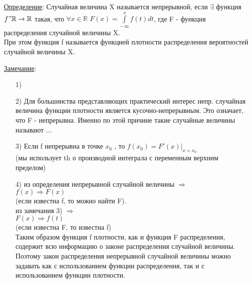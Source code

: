 
\underline{Определение}: Случайная величина X называется непрерывной, если $\exists$ функция $f" \mathbb{R} \to \mathbb{R}$ такая, что $\forall x \in \mathbb{R}$ $F(x) = \int\limits_{-\infty}^{x} f(t) dt$, где F - функция распределения случайной величины X. \\
При этом функция f называется функцией плотности распределения вероятностей случайной величины X.

\underline{Замечание}: 
\begin{enumerate}
	\item[1)]

	\item[2)]
	Для большинства представляющих практический интерес непр. случайная величина функции плотности является кусочно-непрерывным. Это означает, что F - непрерывна. Именно по этой причине такие случайные величины называют ...
	
	\item[3)]
	Если f непрерывна в точке $x_0$ , то $f(x_0) = F'(x) \bigg|_{x = x_0}$ \\
	(мы использует th о производной интеграла с переменным верхним пределом) \\
	
	\item[4)]
	из определения непрерывной случайной величины $\Rightarrow$ \\
	$f(x) \Rightarrow F(x)$ \\
	(если известна f, то можно найти F). \\
	из замечания 3) $\Rightarrow$ \\
	$F(x) \Rightarrow f(t)$ \\
	(если известна F, то известна f) \\
	Таким образом функция f плотности, как и функция F распределения, содержит всю информацию о законе распределения случайной величины. \\
	Поэтому закон распределения непрерывной случайной величины можно задавать как с использованием функции распределения, так и с использованием функции плотности. \\
\end{enumerate}

